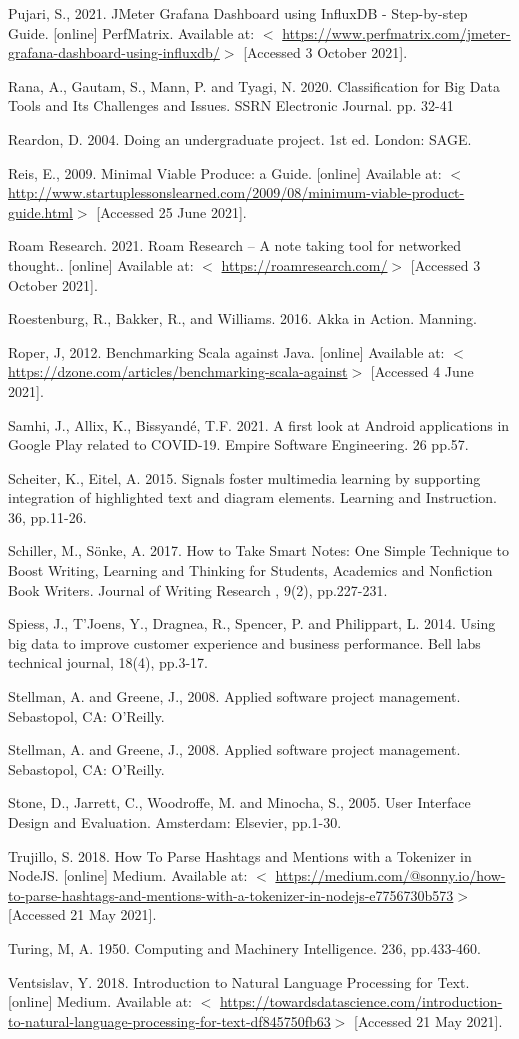 \documentclass{article}
\begin{document}
{Pujari, S., 2021. JMeter Grafana Dashboard using InfluxDB - Step-by-step Guide. [online] PerfMatrix. Available at: $<$ \url{https://www.perfmatrix.com/jmeter-grafana-dashboard-using-influxdb/}$>$ [Accessed 3 October 2021].

Rana, A., Gautam, S., Mann, P. and Tyagi, N. 2020. Classification for Big Data Tools and Its Challenges and Issues. SSRN Electronic Journal. pp. 32-41

Reardon, D. 2004. Doing an undergraduate project. 1st ed. London: SAGE.

Reis, E., 2009. Minimal Viable Produce: a Guide. [online] Available at:  $<$ {\url{http://www.startuplessonslearned.com/2009/08/minimum-viable-product-guide.html}}$>$ [Accessed 25 June 2021].

Roam Research. 2021. Roam Research – A note taking tool for networked thought.. [online] Available at: $<$ \url{https://roamresearch.com/}$>$ [Accessed 3 October 2021].

Roestenburg, R., Bakker, R., and Williams. 2016. Akka in Action. Manning.

Roper, J, 2012. Benchmarking Scala against Java. [online] Available at:  $<$ \url{https://dzone.com/articles/benchmarking-scala-against}$>$ [Accessed 4 June 2021].

Samhi, J., Allix, K., Bissyandé, T.F. 2021. A first look at Android applications in Google Play related to COVID-19. Empire Software Engineering. 26 pp.57.

Scheiter, K., Eitel, A. 2015. Signals foster multimedia learning by supporting integration of highlighted text and diagram elements. Learning and Instruction. 36, pp.11-26.

Schiller, M., Sönke, A. 2017. How to Take Smart Notes: One Simple Technique to Boost Writing, Learning and Thinking for Students, Academics and Nonfiction Book Writers. Journal of Writing Research , 9(2), pp.227-231.

Spiess, J., T'Joens, Y., Dragnea, R., Spencer, P. and Philippart, L. 2014. Using big data to improve customer experience and business performance. Bell labs technical journal, 18(4), pp.3-17.

Stellman, A. and Greene, J., 2008. Applied software project management. Sebastopol, CA: O'Reilly.

Stellman, A. and Greene, J., 2008. Applied software project management. Sebastopol, CA: O'Reilly.

Stone, D., Jarrett, C., Woodroffe, M. and Minocha, S., 2005. User Interface Design and Evaluation. Amsterdam: Elsevier, pp.1-30.

Trujillo, S. 2018. How To Parse Hashtags and Mentions with a Tokenizer in NodeJS. [online] Medium. Available at: $<$ \url{https://medium.com/@sonny.io/how-to-parse-hashtags-and-mentions-with-a-tokenizer-in-nodejs-e7756730b573}$>$ [Accessed 21 May 2021].

Turing, M, A. 1950. Computing and Machinery Intelligence. 236, pp.433-460.

Ventsislav, Y. 2018. Introduction to Natural Language Processing for Text. [online] Medium. Available at: $<$ \url{https://towardsdatascience.com/introduction-to-natural-language-processing-for-text-df845750fb63}$>$ [Accessed 21 May 2021].
}
\end{document}
